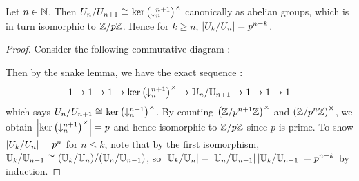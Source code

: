 \begin{prop}
  
  Let $n \in \mathbb{N}$.
  Then $U_n / U_{n+1} \cong_{} \ker \left(\downarrow_{n}^{n+1}\right)^\times$
  canonically as abelian groups, 
  which is in turn isomorphic to $\mathbb{Z}/p\mathbb{Z}$. 
  Hence for $k \geq n$, 
  $\left\vert U_k /U_n \right\vert = p^{n - k}$.
\end{prop}
\begin{proof}
  Consider the following commutative diagram : 
  \begin{figure}[H]
    \centering
  \end{figure}
  Then by the snake lemma, 
  we have the exact sequence : 
  \[1 \to 1 \to 1 \to \ker\left(\downarrow_{n}^{n+1}\right)^\times
  \to \mathbb{U}_n / \mathbb{U}_{n+1} \to 1 \to 1 \to 1 \]
  which says $U_n / U_{n+1} \cong_{} \ker \left(\downarrow_{n}^{n+1}\right)^\times$. 
  By counting $\left(\mathbb{Z}/p^{n+1}\mathbb{Z}\right)^\times$ and $\left(\mathbb{Z}/p^n\mathbb{Z}\right)^\times$,
  we obtain $\left\vert \ker\left(\downarrow_{n}^{n+1}\right)^\times \right\vert = p$
  and hence isomorphic to $\mathbb{Z}/p\mathbb{Z}$ since $p$ is prime. 
  To show $\left\vert U_k/U_n \right\vert = p^n$ for $n \leq k$, 
  note that by the first isomorphism, 
  $\mathbb{U}_k / \mathbb{U}_{n-1} \cong_{} (\mathbb{U}_k / \mathbb{U}_{n}) / (\mathbb{U}_n / \mathbb{U}_{n-1})$,
  so $\left\vert \mathbb{U}_k / \mathbb{U}_{n} \right\vert = \left\vert \mathbb{U}_n / \mathbb{U}_{n-1} \right\vert \left\vert \mathbb{U}_k / \mathbb{U}_{n-1} \right\vert
  = p^{n - k}$ by induction. 
\end{proof}


